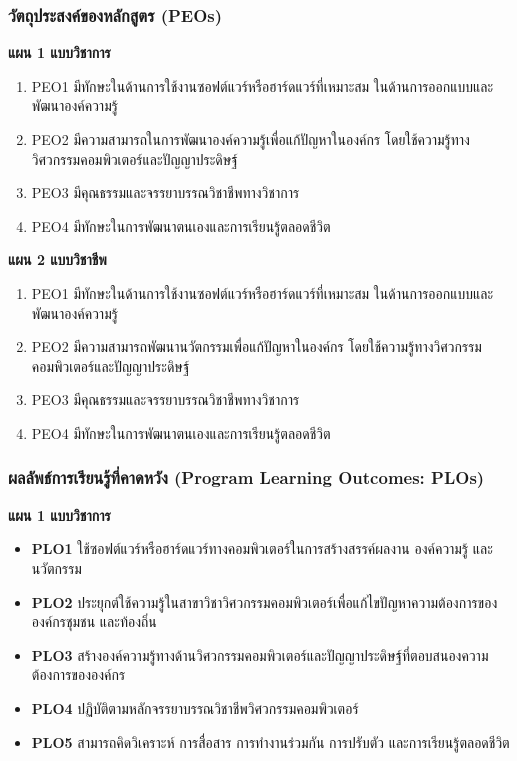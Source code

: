 \subsubsection*{วัตถุประสงค์ของหลักสูตร (PEOs)}

\noindent\textbf{แผน 1 แบบวิชาการ}
\begin{enumerate}
  \item PEO1 มีทักษะในด้านการใช้งานซอฟต์แวร์หรือฮาร์ดแวร์ที่เหมาะสม ในด้านการออกแบบและพัฒนาองค์ความรู้
  \item PEO2 มีความสามารถในการพัฒนาองค์ความรู้เพื่อแก้ปัญหาในองค์กร โดยใช้ความรู้ทางวิศวกรรมคอมพิวเตอร์และปัญญาประดิษฐ์
  \item PEO3 มีคุณธรรมและจรรยาบรรณวิชาชีพทางวิชาการ
  \item PEO4 มีทักษะในการพัฒนาตนเองและการเรียนรู้ตลอดชีวิต
\end{enumerate}

\noindent\textbf{แผน 2 แบบวิชาชีพ}
\begin{enumerate}
  \item PEO1 มีทักษะในด้านการใช้งานซอฟต์แวร์หรือฮาร์ดแวร์ที่เหมาะสม ในด้านการออกแบบและพัฒนาองค์ความรู้
  \item PEO2 มีความสามารถพัฒนานวัตกรรมเพื่อแก้ปัญหาในองค์กร โดยใช้ความรู้ทางวิศวกรรมคอมพิวเตอร์และปัญญาประดิษฐ์
  \item PEO3 มีคุณธรรมและจรรยาบรรณวิชาชีพทางวิชาการ
  \item PEO4 มีทักษะในการพัฒนาตนเองและการเรียนรู้ตลอดชีวิต
\end{enumerate}

\subsubsection*{ผลลัพธ์การเรียนรู้ที่คาดหวัง (Program Learning Outcomes: PLOs)}

\noindent\textbf{แผน 1 แบบวิชาการ}
\begin{itemize}
  \item \textbf{PLO1} ใช้ซอฟต์แวร์หรือฮาร์ดแวร์ทางคอมพิวเตอร์ในการสร้างสรรค์ผลงาน องค์ความรู้ และนวัตกรรม
  \item \textbf{PLO2} ประยุกต์ใช้ความรู้ในสาขาวิชาวิศวกรรมคอมพิวเตอร์เพื่อแก้ไขปัญหาความต้องการขององค์กรชุมชน และท้องถิ่น
  \item \textbf{PLO3} สร้างองค์ความรู้ทางด้านวิศวกรรมคอมพิวเตอร์และปัญญาประดิษฐ์ที่ตอบสนองความต้องการขององค์กร
  \item \textbf{PLO4} ปฏิบัติตามหลักจรรยาบรรณวิชาชีพวิศวกรรมคอมพิวเตอร์
  \item \textbf{PLO5} สามารถคิดวิเคราะห์ การสื่อสาร การทำงานร่วมกัน การปรับตัว และการเรียนรู้ตลอดชีวิต
\end{itemize}

